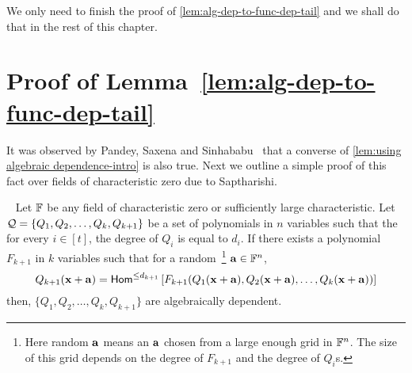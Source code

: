 We only need to finish the proof of \autoref{lem:alg-dep-to-func-dep-tail} and we shall do that in the rest of this chapter. 

\section{Proof of Lemma~\ref{lem:alg-dep-to-func-dep-tail}}




\newpage


It was observed by Pandey, Saxena and Sinhababu~\cite{PSS16} that a converse of \autoref{lem:using algebraic dependence-intro} is also true. Next we outline a simple proof of this fact over fields of characteristic zero due to Saptharishi. 

\begin{lemma}~\label{lem:using algebraic dependence-converse}
Let $\mathbb{F}$ be any  field of characteristic zero or sufficiently large characteristic. Let ${\cal Q} = \{Q_1, Q_2, \ldots, Q_k, Q_{k+1}\}$ be a set of polynomials in $n$ variables such that the for every $i \in [t]$, the degree of  $Q_i$ is equal to $d_i$. 
If there exists a polynomial $F_{k+1}$  in $k$ variables such that for a random~\footnote{Here random $\mathbf{a}$ means an $\mathbf{a}$ chosen from a large enough grid in $\mathbb{F}^n$. The size of this grid depends on the degree of $F_{k+1}$ and the degree of $Q_i$s. } $\mathbf{a} \in \mathbb{F}^{n}$,  
$$Q_{k+1}(\mathbf{x} + \mathbf{a}) = \mathsf{Hom}^{\leq d_{k+1}}\left[F_{k+1}(Q_1(\mathbf{x} + \mathbf{a}), Q_2(\mathbf{x} + \mathbf{a}), \ldots, Q_k(\mathbf{x} + \mathbf{a})) \right] $$
then, $\{Q_1, Q_2, \ldots, Q_k, Q_{k+1}\}$ are algebraically dependent. 
\end{lemma}
